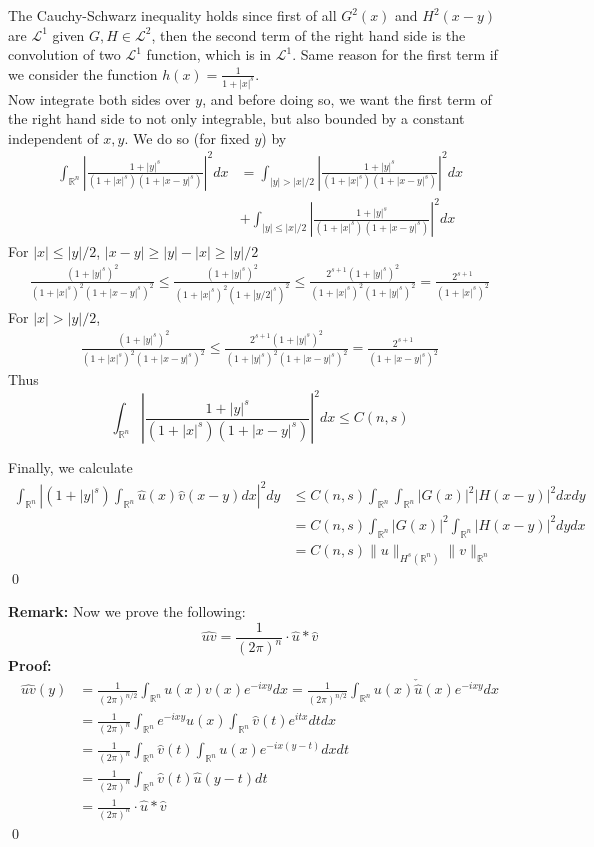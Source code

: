 \documentclass[12pt]{article}
\begin{document}
The Cauchy-Schwarz inequality holds since first of all $G^2(x)$ and $H^2(x-y)$ are $\mathscr{L}^1$ given $G,H\in\mathscr{L}^2$, then the second term of the right hand side is the convolution of two $\mathscr{L}^1$ function, which is in $\mathscr{L}^1$. Same reason for the first term if we consider the function $h(x)=\frac{1}{1+|x|^s}$. \\
\indent Now integrate both sides over $y$, and before doing so, we want the first term of the right hand side to not only integrable, but also bounded by a constant independent of $x,y$. We do so (for fixed $y$) by 
\begin{align}
    \int_{\mathbb{R}^n}\left|\frac{1+|y|^s}{(1+|x|^s)(1+|x-y|^s)}\right|^2dx &= \int_{|y|>|x|/2}\left|\frac{1+|y|^s}{(1+|x|^s)(1+|x-y|^s)}\right|^2dx \\
    &+\int_{|y|\leq |x|/2}\left|\frac{1+|y|^s}{(1+|x|^s)(1+|x-y|^s)}\right|^2dx
\end{align}
For $|x|\leq |y|/2$, $|x-y|\geq |y|-|x|\geq |y|/2$
\begin{align*}
    \frac{(1+|y|^s)^2}{(1+|x|^s)^2(1+|x-y|^s)^2}\leq \frac{(1+|y|^s)^2}{(1+|x|^s)^2(1+|y/2|^s)^2}\leq \frac{2^{s+1}(1+|y|^s)^2}{(1+|x|^s)^2(1+|y|^s)^2}=\frac{2^{s+1}}{(1+|x|^s)^2}
\end{align*}
For $|x|>|y|/2$,
\begin{align*}
    \frac{(1+|y|^s)^2}{(1+|x|^s)^2(1+|x-y|^s)^2}\leq \frac{2^{s+1}(1+|y|^s)^2}{(1+|y|^s)^2(1+|x-y|^s)^2}=\frac{2^{s+1}}{(1+|x-y|^s)^2}
\end{align*}
Thus 
$$
\int_{\mathbb{R}^n}\left|\frac{1+|y|^s}{(1+|x|^s)(1+|x-y|^s)}\right|^2dx\leq C(n,s)
$$

Finally, we calculate
\begin{align*}
    \int_{\mathbb{R}^n}\left|(1+|y|^s)\int_{\mathbb{R}^n}\hat{u}(x)\hat{v}(x-y)dx\right|^2dy&\leq C(n, s)\int_{\mathbb{R}^n}\int_{\mathbb{R}^n}|G(x)|^2|H(x-y)|^2dxdy \\
    &=C(n,s)\int_{\mathbb{R}^n}|G(x)|^2\int_{\mathbb{R}^n}|H(x-y)|^2dydx \\
    &=C(n,s)\|u\|_{H^s(\mathbb{R}^n)}\|v\|_{\mathbb{R}^n}
\end{align*} \qed

\textbf{Remark:} Now we prove the following:
$$
\widehat{uv}=\frac{1}{(2\pi)^n}\cdot\hat{u}*\hat{v}
$$
\textbf{Proof:} 
\begin{align*}
    \widehat{uv}(y)&=\frac{1}{(2\pi)^{n/2}}\int_{\mathbb{R}^n}u(x)v(x)e^{-ixy}dx=\frac{1}{(2\pi)^{n/2}}\int_{\mathbb{R}^n}u(x)\check{\hat{u}}(x)e^{-ixy}dx \\
    &=\frac{1}{(2\pi)^n}\int_{\mathbb{R}^n}e^{-ixy}u(x)\int_{\mathbb{R}^n}\hat{v}(t)e^{itx}dtdx \\
    &=\frac{1}{(2\pi)^n}\int_{\mathbb{R}^n}\hat{v}(t)\int_{\mathbb{R}^n}u(x)e^{-ix(y-t)}dxdt \\
    &=\frac{1}{(2\pi)^n}\int_{\mathbb{R}^n}\hat{v}(t)\hat{u}(y-t)dt \\
    &=\frac{1}{(2\pi)^n}\cdot\hat{u}*\hat{v} 
\end{align*}\qed
\end{document}
